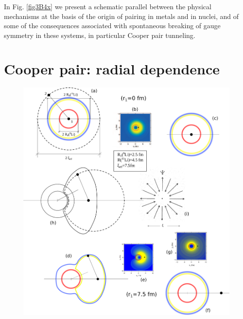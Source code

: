 \begin{subappendices}
In Fig. \ref{fig3B4x} we present a schematic parallel between the physical mechanisms at the basis of the origin of pairing in metals and in nuclei, and of some of the consequences associated with spontaneous breaking of gauge symmetry in these systems, in particular Cooper pair tunneling.  
\section{Cooper pair: radial dependence}\label{App3B}
  \begin{figure}
  	\centerline{\includegraphics*[width=15cm,angle=0	]{nutshell/figs/Fig3B1}}
  	\caption{}\label{fig3B1}
  \end{figure}

\end{subappendices}
